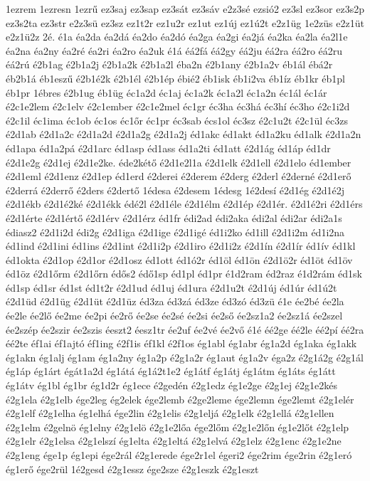 {1ezrem
1ezresn
1ezrű
ez3saj
ez3sap
ez3sát
ez3sáv
e2z3sé
ezsió2
ez3sl
ez3sor
ez3s2p
ez3s2ta
ez3str
e2z3sü
ez3sz
ez1t2r
ez1u2r
ez1ut
ez1új
ez1ú2t
e2z1üg
1e2züs
e2z1üt
e2z1ü2z
2é.
é1a
éa2da
éa2dá
éa2do
éa2dó
éa2ga
éa2gi
éa2já
éa2ka
éa2la
éa2l1e
éa2na
éa2ny
éa2ré
éa2ri
éa2ro
éa2uk
é1á
éá2fá
éá2gy
éá2ju
éá2ra
éá2ro
éá2ru
éá2rú
é2b1ag
é2b1a2j
é2b1a2k
é2b1a2l
éba2n
é2b1any
é2b1a2v
éb1ál
ébá2r
éb2b1á
éb1eszű
é2b1é2k
é2b1él
é2b1ép
ébié2
éb1isk
éb1i2va
éb1íz
éb1kr
éb1pl
éb1pr
1ébres
é2b1ug
éb1üg
éc1a2d
éc1aj
éc1a2k
éc1a2l
éc1a2n
éc1ál
éc1ár
é2c1e2lem
é2c1elv
é2c1ember
é2c1e2mel
éc1gr
éc3ha
éc3há
éc3hí
éc3ho
é2c1i2d
é2c1il
éc1ima
éc1ob
éc1os
éc1őr
éc1pr
éc3sab
écs1ol
éc3sz
é2c1u2t
é2c1ül
éc3zs
é2d1ab
é2d1a2c
é2d1a2d
é2d1a2g
é2d1a2j
éd1akc
éd1akt
éd1a2ku
éd1alk
é2d1a2n
éd1apa
éd1a2pá
é2d1arc
éd1asp
éd1ass
éd1a2ti
éd1att
é2d1ág
éd1áp
éd1dr
é2d1e2g
é2d1ej
é2d1e2ke.
éde2kétő
é2d1e2l1a
é2d1elk
é2d1ell
é2d1elo
éd1ember
é2d1eml
é2d1enz
é2d1ep
éd1erd
é2derei
é2derem
é2derg
é2derl
é2derné
é2d1erő
é2derrá
é2derrő
é2ders
é2dertő
1édesa
é2desem
1édesg
1é2desí
é2d1ég
é2d1é2j
é2d1ékb
é2d1é2ké
é2d1ékk
édé2l
é2d1éle
é2d1élm
é2d1ép
é2d1ér.
é2d1é2ri
é2d1érs
é2d1érte
é2d1értő
é2d1érv
é2d1érz
éd1fr
édi2ad
édi2aka
édi2al
édi2ar
édi2a1s
édiasz2
é2d1i2d
édi2g
é2d1iga
é2d1ige
é2d1igé
éd1i2ko
éd1ill
é2d1i2m
éd1i2na
éd1ind
é2d1ini
éd1ins
é2d1int
é2d1i2p
é2d1iro
é2d1i2z
é2d1ín
é2d1ír
éd1ív
éd1kl
éd1okta
é2d1op
é2d1or
é2d1osz
éd1ott
éd1ó2r
éd1öl
éd1ön
é2d1ö2r
éd1öt
éd1öv
éd1öz
é2d1őrm
é2d1őrn
édős2
édő1sp
éd1pl
éd1pr
é1d2ram
éd2raz
é1d2rám
éd1sk
éd1sp
éd1sr
éd1st
éd1t2r
é2d1ud
éd1uj
éd1ura
é2d1u2t
é2d1új
éd1úr
éd1ú2t
é2d1üd
é2d1üg
é2d1üt
é2d1üz
éd3za
éd3zá
éd3ze
éd3zó
éd3zü
é1e
ée2bé
ée2la
ée2le
ée2lő
ée2me
ée2pi
ée2rő
ée2se
ée2sé
ée2si
ée2ső
ée2sz1a2
ée2sz1á
ée2szel
ée2szép
ée2szir
ée2szis
éeszt2
éesz1tr
ée2uf
ée2vé
ée2vő
é1é
éé2ge
éé2le
éé2pí
éé2ra
éé2te
éf1ai
éf1ajtó
éf1ing
é2f1is
éf1kl
é2f1os
ég1abl
ég1abr
ég1a2d
ég1aka
ég1akk
ég1akn
ég1alj
ég1am
ég1a2ny
ég1a2p
é2g1a2r
ég1aut
ég1a2v
éga2z
é2g1á2g
é2g1ál
ég1áp
ég1árt
égát1a2d
ég1átá
ég1á2t1e2
ég1átf
ég1átj
ég1átm
ég1áts
ég1átt
ég1átv
ég1bl
ég1br
ég1d2r
ég1ece
é2gedén
é2g1edz
ég1e2ge
é2g1ej
é2g1e2kés
é2g1ela
é2g1elb
ége2leg
ég2elek
ége2lemb
é2ge2leme
ége2lemn
ége2lemt
é2g1elér
é2g1elf
é2g1elha
ég1elhá
ége2lin
é2g1elis
é2g1eljá
é2g1elk
é2g1ellá
é2g1ellen
é2g1elm
é2gelnö
ég1elny
é2g1elö
é2g1e2lőa
ége2lőm
é2g1e2lőn
ég1e2lőt
é2g1elp
é2g1elr
é2g1elsa
é2g1elszí
ég1elta
é2g1eltá
é2g1elvá
é2g1elz
é2g1enc
é2g1e2ne
é2g1eng
ége1p
ég1epi
ége2rál
é2g1erede
ége2r1el
égeri2
ége2rim
ége2rin
é2g1eró
ég1erő
ége2rül
1é2gesd
é2g1essz
ége2sze
é2g1eszk
é2g1eszt
}
